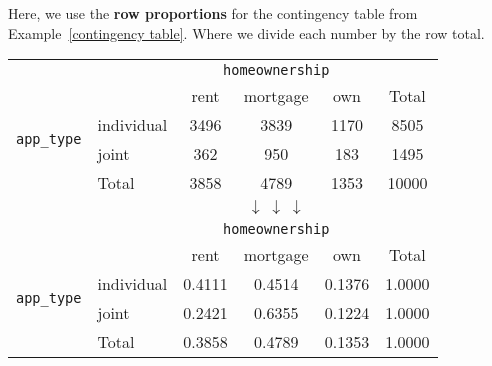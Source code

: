 \documentclass{beamer}
\begin{document}
\begin{frame}
\begin{example}
Here, we use the \textbf{row proportions} for the contingency table from Example~\ref{contingency table}. Where we divide each number by the row total.
\begin{center}
\begin{tabular}{llcccc}
&&\multicolumn{3}{c}{\texttt{homeownership}} &\\\cline{3-5}
&&rent&mortgage&own&Total\\\cline{2-6}
\multirow{2}{*}{{\texttt{app\_type}}} & individual & 3496 & 3839 & 1170 & 8505 \\
&joint & 362 & 950 & 183 & 1495 \\\cline{2-6}
&Total & 3858 & 4789 & 1353 & 10000 \\\cline{2-6}
&&&$\downarrow~\downarrow~\downarrow$\\
&&\multicolumn{3}{c}{\texttt{homeownership}} &\\\cline{3-5}
&&rent&mortgage&own&Total\\\cline{2-6}
\multirow{2}{*}{{\texttt{app\_type}}} & individual & 0.4111 & 0.4514 & 0.1376 & 1.0000 \\
&joint & 0.2421 & 0.6355 & 0.1224 & 1.0000 \\\cline{2-6}
&Total & 0.3858 & 0.4789 & 0.1353 & 1.0000 \\\cline{2-6}
\end{tabular}
\end{center}\pause
{}\pause
{}
\end{example}
\end{frame}
\end{document}
